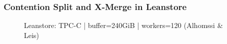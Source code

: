 \documentclass[xcolor=dvipsnames]{beamer}
\begin{document}
%

\begin{frame}
\frametitle{Contention Split and X-Merge in Leanstore}
	
\begin{figure}
	\vspace*{2ex}
	\centering
	
	Leanstore: TPC-C | buffer=240GiB | workers=120 \scriptsize (Alhomssi \& Leis)
\end{figure}
	
\end{frame}

%
\end{document}
